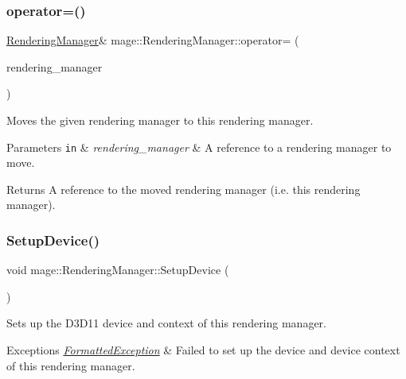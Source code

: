 \subsubsection{\texorpdfstring{operator=()}{operator=()}\hspace{0.1cm}{\footnotesize\ttfamily [2/2]}}
{\footnotesize\ttfamily \hyperlink{classmage_1_1_rendering_manager}{Rendering\+Manager}\& mage\+::\+Rendering\+Manager\+::operator= (\begin{DoxyParamCaption}\item[{\hyperlink{classmage_1_1_rendering_manager}{Rendering\+Manager} \&\&}]{rendering\+\_\+manager }\end{DoxyParamCaption})\hspace{0.3cm}{\ttfamily [delete]}}

Moves the given rendering manager to this rendering manager.


\begin{DoxyParams}[1]{Parameters}
\mbox{\tt in}  & {\em rendering\+\_\+manager} & A reference to a rendering manager to move. \\
\hline
\end{DoxyParams}
\begin{DoxyReturn}{Returns}
A reference to the moved rendering manager (i.\+e. this rendering manager). 
\end{DoxyReturn}
\hypertarget{classmage_1_1_rendering_manager_a45d4cadcd572290f352027b5fa86b4f6}{}\label{classmage_1_1_rendering_manager_a45d4cadcd572290f352027b5fa86b4f6} 
\subsubsection{\texorpdfstring{Setup\+Device()}{SetupDevice()}}
{\footnotesize\ttfamily void mage\+::\+Rendering\+Manager\+::\+Setup\+Device (\begin{DoxyParamCaption}{ }\end{DoxyParamCaption})\hspace{0.3cm}{\ttfamily [private]}}

Sets up the D3\+D11 device and context of this rendering manager.


\begin{DoxyExceptions}{Exceptions}
{\em \hyperlink{classmage_1_1_formatted_exception}{Formatted\+Exception}} & Failed to set up the device and device context of this rendering manager. \\
\hline
\end{DoxyExceptions}
\hypertarget{classmage_1_1_rendering_manager_a3665d58d2a9e8995a348b5f2bd723d8b}{}\label{classmage_1_1_rendering_manager_a3665d58d2a9e8995a348b5f2bd723d8b} 
